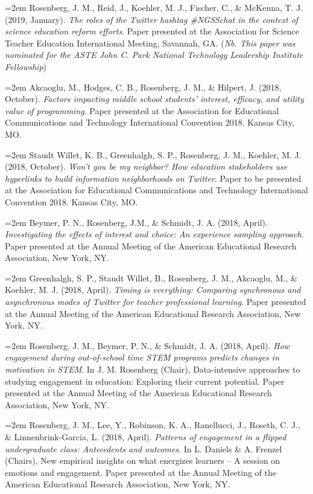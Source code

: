\documentclass[14,]{article}
\begin{document}
\hangindent=2em Rosenberg, J. M., Reid, J., Koehler, M. J., Fischer, C.,
\& McKenna, T. J. (2019, January). \emph{The roles of the Twitter
hashtag \#NGSSchat in the context of science education reform efforts}.
Paper presented at the Association for Science Teacher Education
International Meeting, Savannah, GA. (\emph{Nb. This paper was nominated
for the ASTE John C. Park National Technology Leadership Institute
Fellowship})

\hangindent=2em Akcaoglu, M., Hodges, C. B., Rosenberg, J. M., \&
Hilpert, J. (2018, October). \emph{Factors impacting middle school
students' interest, efficacy, and utility value of programming}. Paper
presented at the Association for Educational Communications and
Technology International Convention 2018. Kansas City, MO.

\hangindent=2em Staudt Willet, K. B., Greenhalgh, S. P., Rosenberg, J.
M., Koehler, M. J. (2018, October). \emph{Won't you be my neighbor? How
education stakeholders use hyperlinks to build information neighborhoods
on Twitter}. Paper to be presented at the Association for Educational
Communications and Technology International Convention 2018. Kansas
City, MO.

\hangindent=2em Beymer, P. N., Rosenberg, J.M., \& Schmidt, J. A. (2018,
April). \emph{Investigating the effects of interest and choice: An
experience sampling approach}. Paper presented at the Annual Meeting of
the American Educational Research Association, New York, NY.

\hangindent=2em Greenhalgh, S. P., Staudt Willet, B., Rosenberg, J. M.,
Akcaoglu, M., \& Koehler, M. J. (2018, April). \emph{Timing is
everything: Comparing synchronous and asynchronous modes of Twitter for
teacher professional learning}. Paper presented at the Annual Meeting of
the American Educational Research Association, New York, NY.

\hangindent=2em Rosenberg, J. M., Beymer, P. N., \& Schmidt, J. A.
(2018, April). \emph{How engagement during out-of-school time STEM
programs predicts changes in motivation in STEM}. In J. M. Rosenberg
(Chair), Data-intensive approaches to studying engagement in education:
Exploring their current potential. Paper presented at the Annual Meeting
of the American Educational Research Association, New York, NY.

\hangindent=2em Rosenberg, J. M., Lee, Y., Robinson, K. A., Ranellucci,
J., Roseth, C. J., \& Linnenbrink-Garcia, L. (2018, April).
\emph{Patterns of engagement in a flipped undergraduate class:
Antecedents and outcomes}. In L. Daniels \& A. Frenzel (Chairs), New
empirical insights on what energizes learners -- A session on emotions
and engagement. Paper presented at the Annual Meeting of the American
Educational Research Association, New York, NY.
\end{document}
